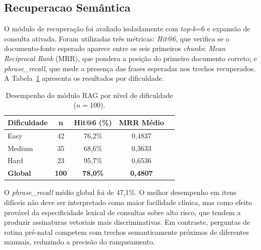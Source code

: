 \documentclass[12pt]{article}
\begin{document}

\subsection{Recuperacao Semântica}

O módulo de recuperação foi avaliado isoladamente com \textit{top-k}=6 e expansão de consulta ativada.
Foram utilizadas três métricas: \textit{Hit@6}, que verifica se o documento-fonte esperado aparece entre os seis primeiros \textit{chunks}; \textit{Mean Reciprocal Rank} (MRR), que pondera a posição do primeiro documento correto; e \textit{phrase\_recall}, que mede a presença das frases esperadas nos trechos recuperados.
A Tabela~\ref{tab:metricas_rag} apresenta os resultados por dificuldade.

\begin{table}[H]
  \centering
  \caption{Desempenho do módulo RAG por nível de dificuldade ($n=100$).}
  \label{tab:metricas_rag}
  \small
  \begin{tabular}{lcccc}
  	\toprule
  	\textbf{Dificuldade} & \textbf{n}   & \textbf{Hit@6 (\%)}  & \textbf{MRR Médio} \\
  	\midrule
  	Easy                 & 42           & 76,2\%               & 0,4837             \\
  	Medium               & 35           & 68,6\%               & 0,3633             \\
  	Hard                 & 23           & 95,7\%               & 0,6536             \\
  	\midrule
  	\textbf{Global}      & \textbf{100} & \textbf{78,0\%}      & \textbf{0,4807}    \\
  	\bottomrule
  	\end{tabular}
  \end{table}
  
O \textit{phrase\_recall} médio global foi de 47,1\%.
O melhor desempenho em itens difíceis não deve ser interpretado como maior facilidade clínica, mas como efeito provável da especificidade lexical de consultas sobre alto risco, que tendem a produzir assinaturas vetoriais mais discriminativas. Em contraste, perguntas de rotina pré-natal competem com trechos semanticamente próximos de diferentes manuais, reduzindo a precisão do ranqueamento.

\end{document}
